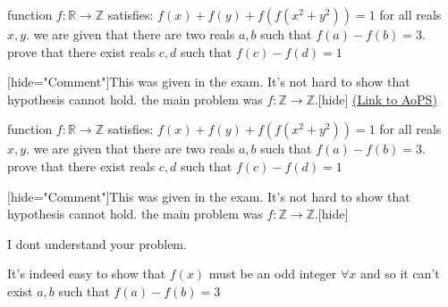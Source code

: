 \begin{problem}
	function $f:\mathbb R\rightarrow \mathbb Z$ satisfies:
$f(x)+f(y)+f(f(x^2+y^2))=1$
for all reals $x,y$.
we are given that there are two reals $a,b$ such that $f(a)-f(b)=3$.
prove that there exist reals $c,d$ such that $f(c)-f(d)=1$

[hide="Comment"]This was given in the exam. It's not hard to show that hypothesis cannot hold. the main problem was $f:\mathbb Z\rightarrow \mathbb Z$.[\/hide]
	\flushright \href{https://artofproblemsolving.com/community/c6h534217}{(Link to AoPS)}
\end{problem}



\begin{solution}
	\begin{tcolorbox}function $f:\mathbb R\rightarrow \mathbb Z$ satisfies:
$f(x)+f(y)+f(f(x^2+y^2))=1$
for all reals $x,y$.
we are given that there are two reals $a,b$ such that $f(a)-f(b)=3$.
prove that there exist reals $c,d$ such that $f(c)-f(d)=1$

[hide="Comment"]This was given in the exam. It's not hard to show that hypothesis cannot hold. the main problem was $f:\mathbb Z\rightarrow \mathbb Z$.[\/hide]\end{tcolorbox}
I dont understand your problem.

It's indeed easy to show that $f(x)$ must be an odd integer $\forall x$ and so it can't exist $a,b$ such that $f(a)-f(b)=3$
\end{solution}






